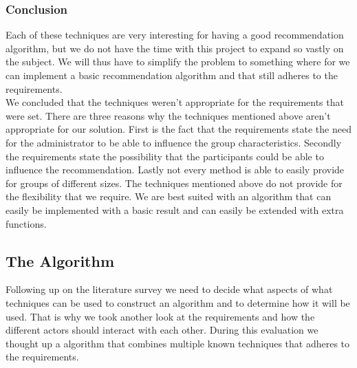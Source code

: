 \documentclass[]{article}
\begin{document}
\subsubsection{Conclusion}
Each of these techniques are very interesting for having a good recommendation algorithm, but we do not have the time with this project to expand so vastly on the subject.
We will thus have to simplify the problem to something where for we can implement a basic recommendation algorithm and that still adheres to the requirements.\\
We concluded that the techniques weren't appropriate for the requirements that were set.
There are three reasons why the techniques mentioned above aren't appropriate for our solution.
First is the fact that the requirements state the need for the administrator to be able to influence the group characteristics.
Secondly the requirements state the possibility that the participants could be able to influence the recommendation.
Lastly not every method is able to easily provide for groups of different sizes.
The techniques mentioned above do not provide for the flexibility that we require.
We are best suited with an algorithm that can easily be implemented with a basic result and can easily be extended with extra functions.

\subsection{The Algorithm}
Following up on the literature survey we need to decide what aspects of what techniques can be used to construct an algorithm and to determine how it will be used.
That is why we took another look at the requirements and how the different actors should interact with each other.
During this evaluation we thought up a algorithm that combines multiple known techniques that adheres to the requirements.
\end{document}
